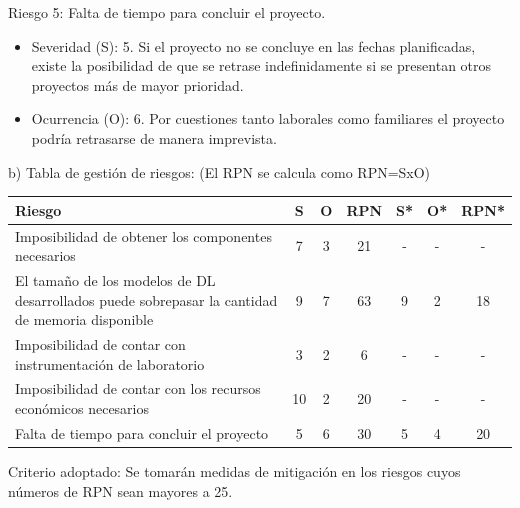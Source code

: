 \documentclass[
11pt, %
]{plan}
\begin{document}
Riesgo 5: Falta de tiempo para concluir el proyecto.
\begin{itemize}
	\item Severidad (S): 5. Si el proyecto no se concluye en las fechas planificadas, existe la posibilidad de que se retrase indefinidamente si se presentan otros proyectos más de mayor prioridad.
	\item Ocurrencia (O): 6. Por cuestiones tanto laborales como familiares el proyecto podría retrasarse de manera imprevista.
\end{itemize}

b) Tabla de gestión de riesgos:      (El RPN se calcula como RPN=SxO)

\begin{table}[htpb]
\centering
\begin{tabularx}{\linewidth}{@{}|X|c|c|c|c|c|c|@{}}
\hline
\rowcolor[HTML]{C0C0C0}
Riesgo & S & O & RPN & S* & O* & RPN* \\ \hline
Imposibilidad de obtener los componentes necesarios & 7 & 3 & 21 & - & - & -\\ \hline
El tamaño de los modelos de DL desarrollados puede sobrepasar la cantidad de memoria disponible & 9 & 7 & 63 & 9 & 2 & 18\\ \hline
Imposibilidad de contar con instrumentación de laboratorio & 3 & 2 & 6 & - & - & -\\ \hline
Imposibilidad de contar con los recursos económicos necesarios & 10 & 2 & 20 & - & - & -\\ \hline
Falta de tiempo para concluir el proyecto & 5 & 6 & 30 & 5 & 4 & 20\\ \hline
\end{tabularx}%
\end{table}

Criterio adoptado:
Se tomarán medidas de mitigación en los riesgos cuyos números de RPN sean mayores a 25.
\end{document}
